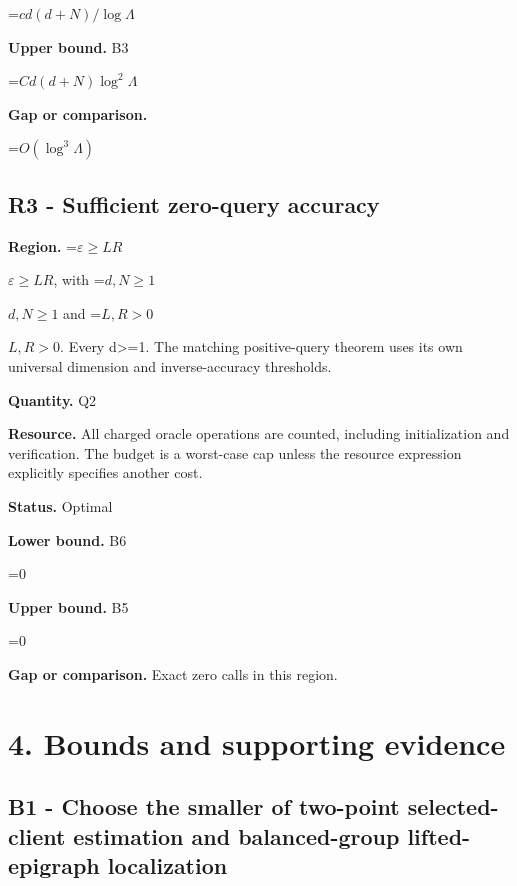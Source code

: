 \documentclass[10pt,a4paper]{article}
\newcommand{\AtlasMath}[1]{\par\begingroup\centering\setbox0=\hbox{$\displaystyle #1$}\ifdim\wd0>1.4\linewidth\typeout{ATLAS WIDE FORMULA: \the\wd0}\fi\ifdim\wd0>\linewidth\resizebox{\linewidth}{!}{\box0}\else\box0\fi\par\endgroup}
\newcommand{\AtlasInlineMath}[1]{\begingroup\setbox0=\hbox{$#1$}\ifdim\wd0>.4\linewidth\endgroup\AtlasMath{#1}\else\endgroup$#1$\fi}
\begin{document}
\AtlasMath{cd(d+N)/\log\Lambda}


\textbf{Upper bound.} B3



\AtlasMath{Cd(d+N)\log^2\Lambda}


\textbf{Gap or comparison.}



\AtlasMath{O(\log^3\Lambda)}


\subsection{R3 - Sufficient zero-query accuracy}


\textbf{Region.} \AtlasInlineMath{\varepsilon\ge LR}, with \AtlasInlineMath{d,N\ge1} and \AtlasInlineMath{L,R>0}. Every d>=1. The matching positive-query theorem uses its own universal dimension and inverse-accuracy thresholds.



\textbf{Quantity.} Q2



\textbf{Resource.} All charged oracle operations are counted, including initialization and verification. The budget is a worst-case cap unless the resource expression explicitly specifies another cost.



\textbf{Status.} Optimal



\textbf{Lower bound.} B6



\AtlasMath{0}


\textbf{Upper bound.} B5



\AtlasMath{0}


\textbf{Gap or comparison.} Exact zero calls in this region.



\section{4. Bounds and supporting evidence}


\subsection{B1 - Choose the smaller of two-point selected-client estimation and balanced-group lifted-epigraph localization}
\end{document}

